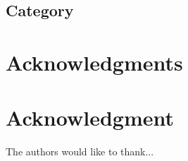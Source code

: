 \documentclass[10pt,journal,compsoc]{IEEEtran}
\theoremstyle{definition}
\theoremstyle{remark}
\begin{document}
\subsection*{Category}
\subsection*{}



\ifCLASSOPTIONcompsoc
  \section*{Acknowledgments}
\else
  \section*{Acknowledgment}
\fi


The authors would like to thank...


\ifCLASSOPTIONcaptionsoff
  \newpage
\fi






\end{document}
